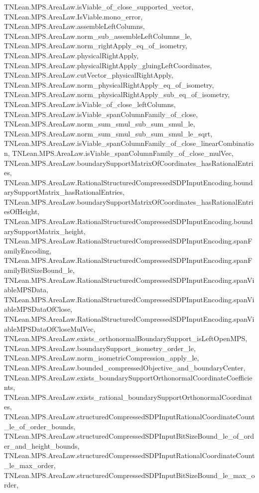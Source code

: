 \begin{lemma}
{        TNLean.MPS.AreaLaw.isViable_of_close_supported_vector,
        TNLean.MPS.AreaLaw.IsViable.mono_error,
        TNLean.MPS.AreaLaw.assembleLeftColumns,
        TNLean.MPS.AreaLaw.norm_sub_assembleLeftColumns_le,
        TNLean.MPS.AreaLaw.norm_rightApply_eq_of_isometry,
        TNLean.MPS.AreaLaw.physicalRightApply,
        TNLean.MPS.AreaLaw.physicalRightApply_gluingLeftCoordinates,
        TNLean.MPS.AreaLaw.cutVector_physicalRightApply,
        TNLean.MPS.AreaLaw.norm_physicalRightApply_eq_of_isometry,
        TNLean.MPS.AreaLaw.norm_physicalRightApply_sub_eq_of_isometry,
        TNLean.MPS.AreaLaw.isViable_of_close_leftColumns,
        TNLean.MPS.AreaLaw.isViable_spanColumnFamily_of_close,
        TNLean.MPS.AreaLaw.norm_sum_smul_sub_sum_smul_le,
        TNLean.MPS.AreaLaw.norm_sum_smul_sub_sum_smul_le_sqrt,
        TNLean.MPS.AreaLaw.isViable_spanColumnFamily_of_close_linearCombination,
        TNLean.MPS.AreaLaw.isViable_spanColumnFamily_of_close_mulVec,
        TNLean.MPS.AreaLaw.boundarySupportMatrixOfCoordinates_hasRationalEntries,
        TNLean.MPS.AreaLaw.RationalStructuredCompressedSDPInputEncoding.boundarySupportMatrix_hasRationalEntries,
        TNLean.MPS.AreaLaw.boundarySupportMatrixOfCoordinates_hasRationalEntriesOfHeight,
        TNLean.MPS.AreaLaw.RationalStructuredCompressedSDPInputEncoding.boundarySupportMatrix_height,
        TNLean.MPS.AreaLaw.RationalStructuredCompressedSDPInputEncoding.spanFamilyEncoding,
        TNLean.MPS.AreaLaw.RationalStructuredCompressedSDPInputEncoding.spanFamilyBitSizeBound_le,
        TNLean.MPS.AreaLaw.RationalStructuredCompressedSDPInputEncoding.spanViableMPSData,
        TNLean.MPS.AreaLaw.RationalStructuredCompressedSDPInputEncoding.spanViableMPSDataOfClose,
        TNLean.MPS.AreaLaw.RationalStructuredCompressedSDPInputEncoding.spanViableMPSDataOfCloseMulVec,
        TNLean.MPS.AreaLaw.exists_orthonormalBoundarySupport_isLeftOpenMPS,
        TNLean.MPS.AreaLaw.boundarySupport_isometry_order_le,
        TNLean.MPS.AreaLaw.norm_isometricCompression_apply_le,
        TNLean.MPS.AreaLaw.bounded_compressedObjective_and_boundaryCenter,
        TNLean.MPS.AreaLaw.exists_boundarySupportOrthonormalCoordinateCoefficients,
        TNLean.MPS.AreaLaw.exists_rational_boundarySupportOrthonormalCoordinates,
        TNLean.MPS.AreaLaw.structuredCompressedSDPInputRationalCoordinateCount_le_of_order_bounds,
        TNLean.MPS.AreaLaw.structuredCompressedSDPInputBitSizeBound_le_of_order_and_height_bounds,
        TNLean.MPS.AreaLaw.structuredCompressedSDPInputRationalCoordinateCount_le_max_order,
        TNLean.MPS.AreaLaw.structuredCompressedSDPInputBitSizeBound_le_max_order,
}
\end{lemma}

